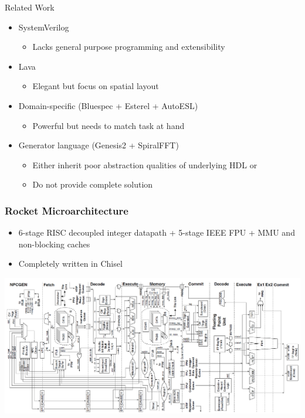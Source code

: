 \documentclass[xcolor=pdflatex,dvipsnames,table]{beamer}
\begin{document}
\begin{frame}{Related Work}

\begin{itemize}
\item SystemVerilog
\begin{itemize}
\item Lacks general purpose programming and extensibility
\end{itemize}
\item Lava
\begin{itemize}
\item Elegant but focus on spatial layout
\end{itemize}
\item Domain-specific (Bluespec + Esterel + AutoESL)
\begin{itemize}
\item Powerful but needs to match task at hand	
\end{itemize}
\item Generator language (Genesis2 + SpiralFFT)
\begin{itemize}
\item Either inherit poor abstraction qualities of underlying HDL or
\item Do not provide complete solution
\end{itemize}
\end{itemize}

\end{frame}

\begin{frame}[fragile]
\frametitle{Rocket Microarchitecture}
\begin{itemize}
\item 6-stage RISC decoupled integer datapath + 5-stage IEEE FPU + MMU
  and non-blocking caches
\item Completely written in Chisel
\end{itemize}
\includegraphics[width=\textwidth]{figs/rocket-microarchitecture.pdf}

\end{frame}
\end{document}
